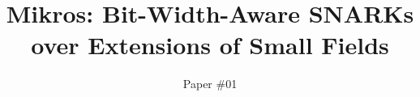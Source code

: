 \documentclass[runningheads]{llncs}
\begin{document}
\title{Mikros: Bit-Width-Aware SNARKs over Extensions of Small Fields}


\author{Paper \#01 \institute{\,} }

%
\maketitle
\end{document}
